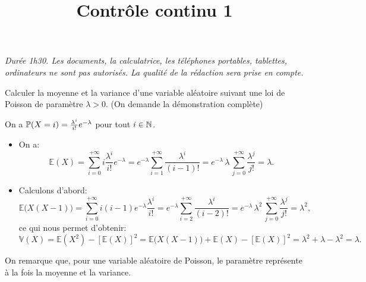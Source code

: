 \documentclass[a4paper]{tp_um}
\title{\large \sffamily\bfseries Contrôle continu 1}
\begin{document}
\maketitle
\textit{Durée 1h30. Les documents, la calculatrice, les téléphones portables, tablettes, ordinateurs ne sont pas autorisés. La qualité de la rédaction sera prise en compte.} 

\bigskip
\bigskip

Calculer la moyenne et la variance d'une variable aléatoire suivant une loi de Poisson de paramètre $\lambda>0$. (On demande la démonstration complète)

\bigskip
On a $\P(X=i) = \frac{\lambda^i}{i!} e^{-\lambda}$ pour tout $i\in\N$.

\begin{itemize}
	\item On a:
		$$ \mathbb{E} (X) = \sum_{i=0}^{+ \infty} i \frac{\lambda^i}{i!}e^{-\lambda}  = e^{-\lambda} \sum_{i=1}^{+ \infty} \frac{\lambda^i}{(i-1)!} =e^{-\lambda}  \, \lambda \, \sum_{j=0}^{+ \infty} \frac{\lambda^j}{j!} = \lambda. $$


	\item Calculons d'abord:
		$$ \mathbb{E} \big( X (X-1) \big) = \sum_{i=0}^{+ \infty} i (i-1) e^{-\lambda} \frac{\lambda^i}{i!} = e^{-\lambda} \sum_{i=2}^{+ \infty} \frac{\lambda^i}{(i-2)!} =e^{-\lambda}  \, \lambda^2 \, \sum_{j=0}^{+ \infty} \frac{\lambda^j}{j!} = \lambda^2, $$
		ce qui nous permet d'obtenir:
		$$ \mathbb{V} (X) = \mathbb{E}(X^2) - [\mathbb{E}(X)]^2 = \mathbb{E} \big( X (X-1) \big) + \mathbb{E}(X) - [\mathbb{E}(X)]^2 =  \lambda^2 + \lambda - \lambda^2 = \lambda.$$
\end{itemize}
On remarque que, pour une variable aléatoire de Poisson, le paramètre représente à la fois la moyenne et la variance.
\end{document}
